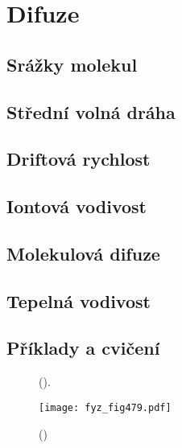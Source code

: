 \setchaptertoc
\chapter{Difuze}\label{fyz:IchapXLIII}

  \section{Srážky molekul}\label{fyz:IchapXLIIIsecI}
  \section{Střední volná dráha}\label{fyz:IchapXLIIIsecII}
  \section{Driftová rychlost}\label{fyz:IchapXLIIIsecIII}
  \section{Iontová vodivost}\label{fyz:IchapXLIIIsecIV}
  \section{Molekulová difuze}\label{fyz:IchapXLIIIsecV}
  \section{Tepelná vodivost}\label{fyz:IchapXLIIIsecVI}
  \section{Příklady a cvičení}\label{fyz:IchapXLIIIsecVII}

  \begin{figure}[hb!] %
    \centering
      \newline
    \caption{
             (\cite[s.~601]{Feynman01}).}
    \label{fyz:fig478}
  \end{figure}

    \begin{figure}[ht!] %
      \centering
      \texttt{[image: fyz\_fig479.pdf]}
      \caption{ 
               (\cite[s.~707]{Feynman01})}
      \label{fyz:fig479}
    \end{figure}
